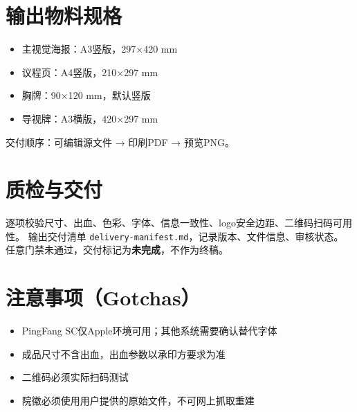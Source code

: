 \documentclass[11pt,a4paper]{article}
\begin{document}
	\section{输出物料规格}
	\begin{itemize}
		\item 主视觉海报：A3竖版，297×420 mm
		\item 议程页：A4竖版，210×297 mm
		\item 胸牌：90×120 mm，默认竖版
		\item 导视牌：A3横版，420×297 mm
	\end{itemize}
	交付顺序：可编辑源文件 → 印刷PDF → 预览PNG。
	
	\section{质检与交付}
	逐项校验尺寸、出血、色彩、字体、信息一致性、logo安全边距、二维码扫码可用性。
	输出交付清单 \texttt{delivery-manifest.md}，记录版本、文件信息、审核状态。
	任意门禁未通过，交付标记为\textbf{未完成}，不作为终稿。
	
	\section{注意事项（Gotchas）}
	\begin{itemize}
		\item PingFang SC仅Apple环境可用；其他系统需要确认替代字体
		\item 成品尺寸不含出血，出血参数以承印方要求为准
		\item 二维码必须实际扫码测试
		\item 院徽必须使用用户提供的原始文件，不可网上抓取重建
	\end{itemize}
	
\end{document}
